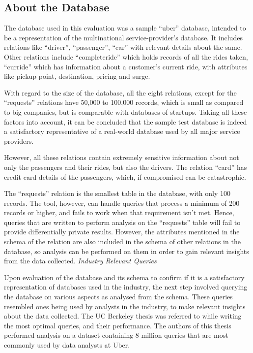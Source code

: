 \documentclass[acmsmall]{acmart}
\begin{document}
\subsection{About the Database}\label{4.2}
The database used in this evaluation was a sample “uber” database, intended to be a representation of the multinational service-provider’s database. It includes relations like “driver”, “passenger”, “car” with relevant details about the same. Other relations include “completeride” which holds records of all the rides taken, “curride” which has information about a customer’s current ride, with attributes like pickup point, destination, pricing and surge.

With regard to the size of the database, all the eight relations, except for the “requests” relations have 50,000 to 100,000 records, which is small as compared to big companies, but is comparable with databases of startups. Taking all these factors into account, it can be concluded that the sample test database is indeed a satisfactory representative of a real-world database used by all major service providers.

However, all these relations contain extremely sensitive information about not only the passengers and their rides, but also the drivers. The relation “card\textunderscore” has credit card details of the passengers, which, if compromised can be catastrophic.

The “requests” relation is the smallest table in the database, with only 100 records. The tool, however, can handle queries that process a minimum of 200 records or higher, and fails to work when that requirement isn’t met. Hence, queries that are written to perform analysis on the “requests” table will fail to provide differentially private results. However, the attributes mentioned in the schema of the relation are also included in the schema of other relations in the database, so analysis can be performed on them in order to gain relevant insights from the data collected.
\newline
\newline
\textit{Industry Relevant Queries}

Upon evaluation of the database and its schema to confirm if it is a satisfactory representation of databases used in the industry, the next step involved querying the database on various aspects as analysed from the schema. These queries resembled ones being used by analysts in the industry, to make relevant insights about the data collected. The UC Berkeley thesis was referred to while writing the most optimal queries, and their performance. The authors of this thesis performed analysis on a dataset containing 8 million queries that are most commonly used by data analysts at Uber. 
\end{document}
